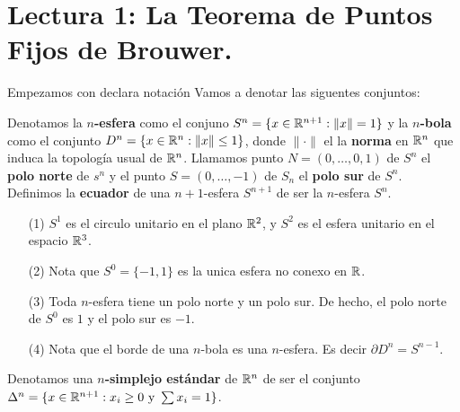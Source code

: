 \section*{Lectura 1: La Teorema de Puntos Fijos de Brouwer.}

Empezamos con declara notaci\'on Vamos a denotar las siguentes conjuntos:

\begin{definition}
    Denotamos la \textbf{$n$-esfera} como el conjuno $S^n=\{x \in
    \mathbb{R}^{n+1} : \|x\|=1\}$ y la \textbf{$n$-bola} como el conjunto $D^n=\{x
    \in \mathbb{R}^{n} : \|x\| \leq 1\}$, donde $\|\cdot\|$ el la \textbf{norma} en
    $\mathbb{R}^n$ que induca la topolog\'ia usual de $\mathbb{R}^n$. Llamamos punto
    $N=(0,\dots,0,1)$ de $S^n$ el \textbf{polo norte} de $s^n$ y el punto $S=(0,
    \dots, -1)$ de $S_n$ el  \textbf{polo sur} de $S^n$. Definimos la
    \textbf{ecuador} de una $n+1$-esfera $S^{n+1}$ de ser la $n$-esfera $S^n$.
\end{definition}

\begin{example}\label{exmp_1}
    \begin{enumerate}
        \item[(1)] $S^1$ es el circulo unitario en el plano $\mathbb{R}^2$, y  $S^2$ es
            el esfera unitario en el espacio $\mathbb{R}^3$.

        \item[(2)] Nota que $S^0=\{-1,1\}$ es la unica esfera no conexo en $\mathbb{R}$.

        \item[(3)] Toda $n$-esfera tiene un polo norte y un polo sur. De hecho,
            el polo norte de $S^0$ es $1$ y el polo sur es $-1$.

        \item[(4)] Nota que el borde de una $n$-bola es una  $n$-esfera. Es
            decir  $\partial{D^n}=S^{n-1}$.
    \end{enumerate}
\end{example}

\begin{definition}
    Denotamos una \textbf{$n$-simplejo est\'andar} de $\mathbb{R}^n$ de ser el conjunto
    $\Delta^n=\{x \in \mathbb{R}^{n+1} : x_i \geq 0 \text{ y } \sum{x_i}=1\}$.
\end{definition}

